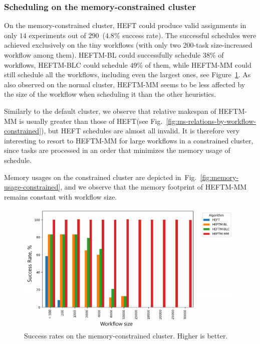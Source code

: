\documentclass[conference]{IEEEtran}
\newcommand{\algo}[1]{\textsc{#1}}
\newcommand{\heft}{\algo{HEFT}\xspace}
\newcommand{\heftmm}{\algo{HEFTM-MM}\xspace}
\newcommand{\heftbl}{\algo{HEFTM-BL}\xspace}
\newcommand{\heftblc}{\algo{HEFTM-BLC}\xspace}
\begin{document}
\subsubsection{Scheduling on the memory-constrained cluster}

    On the memory-constrained cluster, \heft could produce valid assignments in only $14$ experiments
    out of $290$~($4.8\%$ success rate).
    The successful schedules were achieved exclusively on the tiny workflows (with only two 200-task size-increased
    workflow among them).
    \heftbl could successfully schedule $38\%$ of workflows, \heftblc could schedule $49\%$ of them, while \heftmm
    could still schedule all the workflows, including even the largest ones, see Figure~\ref{fig:success-rates-tiny}.
    As also observed on the normal cluster, \heftmm seems to be less affected by the size of the workflow
    when scheduling it than the other heuristics.

    Similarly to the default cluster, we observe that relative makespan of \heftmm is usually greater
    than those of \heft (see Fig.~\ref{fig:ms-relations-by-workflow-constrained}), but \heft schedules are
    almost all invalid. It is therefore very interesting to resort to \heftmm for large workflows
    in a constrained cluster, since tasks are processed in an order that minimizes
    the memory usage of schedule.
%
%
%

    Memory usages on the constrained cluster are depicted in~Fig.~\ref{fig:memory-usage-constrained},
    and we observe that the memory footprint of \heftmm remains constant with workflow size.


    \begin{figure}[tb]
        \centering
        \includegraphics[width=1\columnwidth] {images/success-rates-tiny}
        \caption{Success rates on the memory-constrained cluster. Higher is better. }
        \label{fig:success-rates-tiny}
        \vspace{-0.3cm}
    \end{figure}
\end{document}
